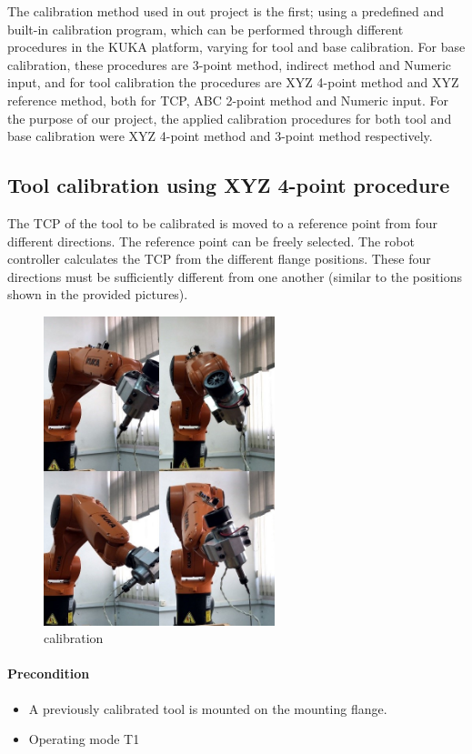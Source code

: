 The calibration method used in out project is the first; using a predefined and built-in calibration program, which can be performed through different procedures in the KUKA platform, varying for tool and base calibration. For base calibration, these procedures are 3-point method, indirect method and Numeric input, and for tool calibration the procedures are XYZ 4-point method and XYZ reference method, both for TCP, ABC 2-point method and Numeric input. For the purpose of our project, the applied calibration procedures for both tool and base calibration were XYZ 4-point method and 3-point method respectively.

\subsection{Tool calibration using XYZ 4-point procedure}
	The TCP of the tool to be calibrated is moved to a reference point from four different directions. The reference point can be freely selected. The robot controller calculates the TCP from the different flange positions. These four directions must be sufficiently different from one another (similar to the positions shown in the provided pictures).
\begin{figure}
    \centering
    \includegraphics[width=0.6\textwidth]{figures/calibration1}
    \caption{calibration}
    \label{fig:calibration1}
\end{figure}

\paragraph{Precondition}
\begin{itemize}
	\item A previously calibrated tool is mounted on the mounting flange.
	\item Operating mode T1
\end{itemize}

